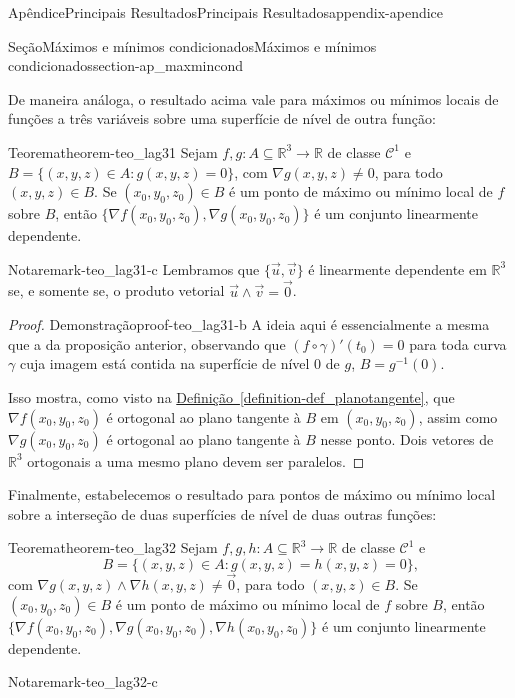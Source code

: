\documentclass[oneside,10pt,]{book}
\newcommand{\xreffont}{\relax}
\numberwithin{equation}{section}
\newcommand{\R}{\mathbb R}
\begin{document}
\begin{appendixptx}{Apêndice}{Principais Resultados}{}{Principais Resultados}{}{}{appendix-apendice}
\begin{sectionptx}{Seção}{Máximos e mínimos condicionados}{}{Máximos e mínimos condicionados}{}{}{section-ap_maxmincond}
\par
De maneira análoga, o resultado acima vale para máximos ou mínimos locais de funções a três variáveis sobre uma superfície de nível de outra função:%
\begin{theorem}{Teorema}{}{}{theorem-teo_lag31}%
Sejam \(f,g\colon A\subseteq\R^3\to\R\) de classe \(\mathscr{C}^1\) e \(B=\big\{(x,y,z)\in A\colon
g(x,y,z)=0\big\}\), com \(\nabla g(x,y,z)\neq 0\), para todo \((x,y,z)\in B\). Se \((x_0,y_0,z_0)\in B\) é um ponto de máximo ou mínimo local de \(f\) sobre \(B\), então \(\big\{\nabla f(x_0,y_0,z_0),\nabla g(x_0,y_0,z_0)\big\}\) é um conjunto linearmente dependente.\begin{remark}{Nota}{}{remark-teo_lag31-c}%
Lembramos que \(\{\vec{u},\vec{v}\}\) é linearmente dependente em \(\R^3\) se, e somente se, o produto vetorial \(\vec{u}\wedge\vec{v}=\vec{0}\).\end{remark}
\end{theorem}
\begin{proof}{Demonstração}{}{proof-teo_lag31-b}
A ideia aqui é essencialmente a mesma que a da proposição anterior, observando que \((f\circ\gamma)'(t_0)=0\) para toda curva \(\gamma\) cuja imagem está contida na superfície de nível \(0\) de \(g\), \(B=g^{-1}(0)\).%
\par
Isso mostra, como visto na \hyperref[definition-def_planotangente]{Definição~{\xreffont\ref{definition-def_planotangente}}}, que \(\nabla f(x_0,y_0,z_0)\) é ortogonal ao plano tangente à \(B\) em \((x_0,y_0,z_0)\), assim como \(\nabla
g(x_0,y_0,z_0)\) é ortogonal ao plano tangente à \(B\) nesse ponto. Dois vetores de \(\R^3\) ortogonais a uma mesmo plano devem ser paralelos.%
\end{proof}
Finalmente, estabelecemos o resultado para pontos de máximo ou mínimo local sobre a interseção de duas superfícies de nível de duas outras funções:%
\begin{theorem}{Teorema}{}{}{theorem-teo_lag32}%
Sejam \(f,g,h\colon A\subseteq\R^3\to\R\) de classe \(\mathscr{C}^1\) e%
\begin{equation*}
B=\big\{(x,y,z)\in A\colon
g(x,y,z)=h(x,y,z)=0\big\}\text{,}
\end{equation*}
com \(\nabla g(x,y,z)\wedge\nabla
h(x,y,z)\neq\vec{0}\), para todo \((x,y,z)\in B\). Se \((x_0,y_0,z_0)\in B\) é um ponto de máximo ou mínimo local de \(f\) sobre \(B\), então \(\big\{\nabla
f(x_0,y_0,z_0),\nabla g(x_0,y_0,z_0),\nabla
h(x_0,y_0,z_0)\big\}\) é um conjunto linearmente dependente.\begin{remark}{Nota}{}{remark-teo_lag32-c}%

\end{remark}
\end{theorem}
\end{sectionptx}
\end{appendixptx}
\end{document}
